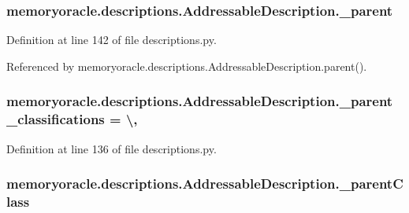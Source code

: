 \subsubsection[{\+\_\+parent}]{\setlength{\rightskip}{0pt plus 5cm}memoryoracle.\+descriptions.\+Addressable\+Description.\+\_\+parent\hspace{0.3cm}{\ttfamily [private]}}\label{classmemoryoracle_1_1descriptions_1_1AddressableDescription_afc0dda5186169a237d82c5de7cdafb8a}


Definition at line 142 of file descriptions.\+py.



Referenced by memoryoracle.\+descriptions.\+Addressable\+Description.\+parent().

\hypertarget{classmemoryoracle_1_1descriptions_1_1AddressableDescription_a086e6a539d6efb57bf98ea9e3cb52daf}{}
\subsubsection[{\+\_\+parent\+\_\+classifications}]{\setlength{\rightskip}{0pt plus 5cm}memoryoracle.\+descriptions.\+Addressable\+Description.\+\_\+parent\+\_\+classifications = \textbackslash{}\hspace{0.3cm}{\ttfamily [static]}, {\ttfamily [private]}}\label{classmemoryoracle_1_1descriptions_1_1AddressableDescription_a086e6a539d6efb57bf98ea9e3cb52daf}


Definition at line 136 of file descriptions.\+py.

\hypertarget{classmemoryoracle_1_1descriptions_1_1AddressableDescription_a0dfa40ff7ce8f74eacb3a603a272a720}{}
\subsubsection[{\+\_\+parent\+Class}]{\setlength{\rightskip}{0pt plus 5cm}memoryoracle.\+descriptions.\+Addressable\+Description.\+\_\+parent\+Class\hspace{0.3cm}{\ttfamily [private]}}\label{classmemoryoracle_1_1descriptions_1_1AddressableDescription_a0dfa40ff7ce8f74eacb3a603a272a720}


